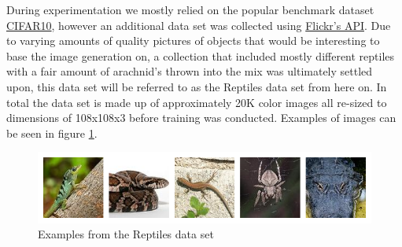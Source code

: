 During experimentation we mostly relied on the popular benchmark dataset \href{https://www.cs.toronto.edu/~kriz/cifar.html}{CIFAR10}, however an additional data set was collected using \href{https://www.flickr.com/services/api/}{Flickr's API}. Due to varying amounts of quality pictures of objects that would be interesting to base the image generation on, a collection that included mostly different reptiles with a fair amount of arachnid's thrown into the mix was ultimately settled upon, this data set will be referred to as the Reptiles data set from here on. In total the data set is made up of approximately 20K color images all re-sized to dimensions of 108x108x3 before training was conducted. Examples of images can be seen in figure \ref{fig:reptiles}.


\begin{figure}[H]
\centering
\includegraphics[width=\textwidth]{figures/reptiles.png}
\caption{Examples from the Reptiles data set}
\label{fig:reptiles}
\end{figure}
